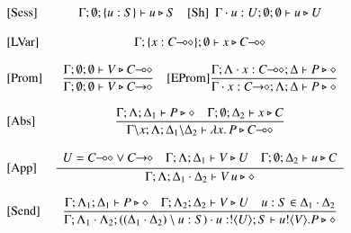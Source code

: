 \begin{figure}[t]
\[
	\begin{array}{lc}
	\trule{Sess}& \Gamma; \emptyset; \set{u:S} \proves u \hastype S 
		\quad
		\trule{Sh}~~\Gamma \cat u : U; \emptyset; \emptyset \proves u \hastype U
\\[4mm]
	\trule{LVar}& \Gamma; \set{x: \lhot{C}}; \emptyset \proves x \hastype \lhot{C}
		\\[4mm]

		\trule{Prom}& \tree{
			\Gamma; \emptyset; \emptyset \proves V \hastype 
                         \lhot{C}
		}{
			\Gamma; \emptyset; \emptyset \proves V \hastype 
                         \shot{C}
		} 
		\quad
		\trule{EProm}\tree{
		\Gamma; \Lambda \cat x : \lhot{C}; \Delta \proves P \hastype \Proc
		}{
			\Gamma \cat x:\shot{C}; \Lambda; \Delta \proves P \hastype \Proc
		}
		\\[6mm]


		\trule{Abs}& \tree{
			\Gamma; \Lambda; \Delta_1 \proves P \hastype \Proc
			\quad
			\Gamma; \es; \Delta_2 \proves x \hastype C
		}{
			\Gamma\backslash x; \Lambda; \Delta_1 \backslash \Delta_2 \proves \abs{{x}}{P} \hastype \lhot{{C}}
		}
		\\[6mm]

		\trule{App}& \tree{
			\begin{array}{c}
				U = \lhot{C} \lor \shot{C}
				\quad
				\Gamma; \Lambda; \Delta_1 \proves V \hastype U
				\quad
				\Gamma; \es; \Delta_2 \proves u \hastype C
			\end{array}
		}{
			\Gamma; \Lambda; \Delta_1 \cat \Delta_2 \proves \appl{V}{u} \hastype \Proc
		} 
		\\[6mm]


		\trule{Send}& \tree{
			\Gamma; \Lambda_1; \Delta_1 \proves P \hastype \Proc
			\quad
			\Gamma; \Lambda_2; \Delta_2 \proves V \hastype U
			\quad
			u:S \in \Delta_1 \cat \Delta_2
		}{
			\Gamma; \Lambda_1 \cat \Lambda_2; ((\Delta_1 \cat \Delta_2) \setminus u:S) \cat u:\btout{U} S \proves \bout{u}{V} P \hastype \Proc
		}
		\\[6mm]


\end{array}\]
\end{figure}
